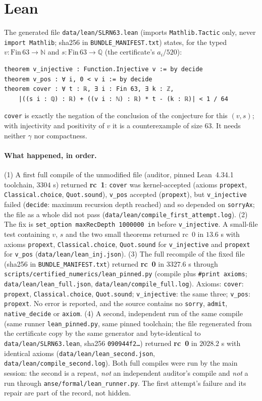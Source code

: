 \documentclass[10pt]{article}
\newcommand{\lean}[1]{\texttt{#1}}
\begin{document}
\section{Lean}\label{sec:lean}
The generated file \texttt{data/lean/SLRN63.lean} (imports \texttt{Mathlib.Tactic} only, never \texttt{import Mathlib}; sha256 in \texttt{BUNDLE\_MANIFEST.txt}) states, for the typed $v:\mathrm{Fin}\,63\to\mathbb N$ and $s:\mathrm{Fin}\,63\to\mathbb Q$ (the certificate's $a_i/520$):
\begin{lstlisting}
theorem v_injective : Function.Injective v := by decide
theorem v_pos : ∀ i, 0 < v i := by decide
theorem cover : ∀ t : ℝ, ∃ i : Fin 63, ∃ k : ℤ,
    |((s i : ℚ) : ℝ) + ((v i : ℕ) : ℝ) * t - (k : ℝ)| < 1 / 64
\end{lstlisting}
\lean{cover} is exactly the negation of the conclusion of the conjecture for this $(v,s)$; with injectivity and positivity of $v$ it is a counterexample of size $63$. It needs neither $\gamma$ nor compactness.
\paragraph{What happened, in order.} (1) A first full compile of the unmodified file (auditor, pinned Lean~4.34.1 toolchain, $3304$ s) returned \textbf{rc~1}: \lean{cover} was kernel-accepted (axioms \lean{propext}, \lean{Classical.choice}, \lean{Quot.sound}), \lean{v\_pos} accepted (\lean{propext}), but \lean{v\_injective} failed (\texttt{decide}: maximum recursion depth reached) and so depended on \lean{sorryAx}; the file as a whole did not pass (\texttt{data/lean/compile\_first\_attempt.log}). (2) The fix is \texttt{set\_option maxRecDepth 1000000 in} before \lean{v\_injective}. A small-file test containing $v$, $s$ and the two small theorems returned rc~0 in $13.6$ s with axioms \lean{propext}, \lean{Classical.choice}, \lean{Quot.sound} for \lean{v\_injective} and \lean{propext} for \lean{v\_pos} (\texttt{data/lean/lean\_inj.json}). (3) The full recompile of the fixed file (sha256 in \texttt{BUNDLE\_MANIFEST.txt}) returned \textbf{rc~0} in $3327.6$ s through \texttt{scripts/certified\_numerics/lean\_pinned.py} (compile plus \texttt{\#print axioms}; \texttt{data/lean/lean\_full.json}, \texttt{data/lean/compile\_full.log}). Axioms: \lean{cover}: \lean{propext}, \lean{Classical.choice}, \lean{Quot.sound}; \lean{v\_injective}: the same three; \lean{v\_pos}: \lean{propext}. No error is reported, and the source contains no \texttt{sorry}, \texttt{admit}, \texttt{native\_decide} or \texttt{axiom}. (4) A second, independent run of the same compile (same runner \texttt{lean\_pinned.py}, same pinned toolchain; the file regenerated from the certificate copy by the same generator and byte-identical to \texttt{data/lean/SLRN63.lean}, sha256 \texttt{090944f2\ldots}) returned \textbf{rc~0} in $2028.2$ s with identical axioms (\texttt{data/lean/lean\_second.json}, \texttt{data/lean/compile\_second.log}). Both full compiles were run by the main session: the second is a repeat, \emph{not} an independent auditor's compile and \emph{not} a run through \texttt{anse/formal/lean\_runner.py}. The first attempt's failure and its repair are part of the record, not hidden.
\end{document}
